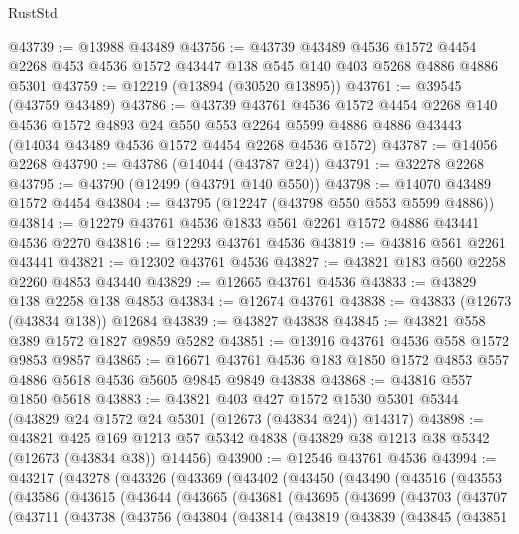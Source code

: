 \begin{lexlean}{RustStd}
\begin{coremodule}
{\begin{coremodule}
{{{{{{{{{{{{{{{{{{{{{{{{{{{{{{{{{{{{{{{{{{{{{{{{{{{{{{{{{{{{{{{{{{{{{{{{{{{{{{{{@43739 := @13988 @43489
@43756 := @43739
    @43489
    @4536
    @1572
    @4454
    @2268
    @453
    @4536
    @1572
    @43447
    @138
    @545
    @140
    @403
    @5268
    @4886
    @4886
    @5301
@43759 := @12219 (@13894 (@30520 @13895))
@43761 := @39545 (@43759 @43489)
@43786 := @43739
    @43761
    @4536
    @1572
    @4454
    @2268
    @140
    @4536
    @1572
    @4893
    @24
    @550
    @553
    @2264
    @5599
    @4886
    @4886
    @43443
    (@14034 @43489 @4536 @1572 @4454 @2268 @4536 @1572)
@43787 := @14056 @2268
@43790 := @43786 (@14044 (@43787 @24))
@43791 := @32278 @2268
@43795 := @43790 (@12499 (@43791 @140 @550))
@43798 := @14070 @43489 @1572 @4454
@43804 := @43795 (@12247 (@43798 @550 @553 @5599 @4886))
@43814 := @12279 @43761 @4536 @1833 @561 @2261 @1572 @4886 @43441 @4536 @2270
@43816 := @12293 @43761 @4536
@43819 := @43816 @561 @2261 @43441
@43821 := @12302 @43761 @4536
@43827 := @43821 @183 @560 @2258 @2260 @4853 @43440
@43829 := @12665 @43761 @4536
@43833 := @43829 @138 @2258 @138 @4853
@43834 := @12674 @43761
@43838 := @43833 (@12673 (@43834 @138)) @12684
@43839 := @43827 @43838
@43845 := @43821 @558 @389 @1572 @1827 @9859 @5282
@43851 := @13916 @43761 @4536 @558 @1572 @9853 @9857
@43865 := @16671 @43761 @4536 @183 @1850 @1572 @4853 @557 @4886 @5618 @4536 @5605 @9845 @9849 @43838
@43868 := @43816 @557 @1850 @5618
@43883 := @43821
    @403
    @427
    @1572
    @1530
    @5301
    @5344
    (@43829 @24 @1572 @24 @5301 (@12673 (@43834 @24)) @14317)
@43898 := @43821
    @425
    @169
    @1213
    @57
    @5342
    @4838
    (@43829 @38 @1213 @38 @5342 (@12673 (@43834 @38)) @14456)
@43900 := @12546 @43761 @4536
@43994 := @43217
    (@43278
      (@43326
        (@43369
          (@43402
            (@43450
              (@43490
                (@43516
                  (@43553
                    (@43586
                      (@43615
                        (@43644
                          (@43665
                            (@43681
                              (@43695
                                (@43699
                                  (@43703
                                    (@43707
                                      (@43711
                                        (@43738
                                          (@43756
                                            (@43804
                                              (@43814
                                                (@43819
                                                  (@43839
                                                    (@43845
                                                      (@43851
}}}}}}}}}}}}}}}}}}}}}}}}}}}}}}}}}}}}}}}}}}}}}}}}}}}}}}}}}}}}}}}}}}}}}}}}}}}}}}}}
\end{coremodule}}
\end{coremodule}
\end{lexlean}
